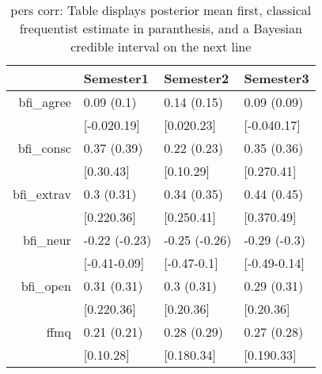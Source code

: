 \begin{table}[ht]
\centering
\begin{tabular}{rlll}
  \hline
 & Semester1 & Semester2 & Semester3 \\ 
  \hline
bfi\_agree & 0.09 (0.1) & 0.14 (0.15) & 0.09 (0.09) \\ 
   & [-0.020.19] & [0.020.23] & [-0.040.17] \\ 
  bfi\_consc & 0.37 (0.39) & 0.22 (0.23) & 0.35 (0.36) \\ 
     & [0.30.43] & [0.10.29] & [0.270.41] \\ 
  bfi\_extrav & 0.3 (0.31) & 0.34 (0.35) & 0.44 (0.45) \\ 
       & [0.220.36] & [0.250.41] & [0.370.49] \\ 
  bfi\_neur & -0.22 (-0.23) & -0.25 (-0.26) & -0.29 (-0.3) \\ 
         & [-0.41-0.09] & [-0.47-0.1] & [-0.49-0.14] \\ 
  bfi\_open & 0.31 (0.31) & 0.3 (0.31) & 0.29 (0.31) \\ 
           & [0.220.36] & [0.20.36] & [0.20.36] \\ 
  ffmq & 0.21 (0.21) & 0.28 (0.29) & 0.27 (0.28) \\ 
             & [0.10.28] & [0.180.34] & [0.190.33] \\ 
   \hline
\end{tabular}
\caption{pers corr: Table displays posterior mean first, classical frequentist estimate in paranthesis, and a Bayesian credible interval on the next line} 
\label{pers_corr}
\end{table}
